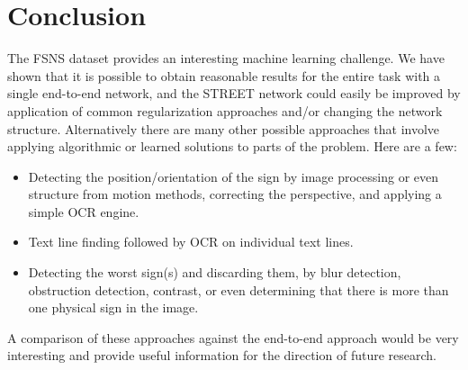 \documentclass[runningheads]{llncs}
\begin{document}
\section{Conclusion}
The FSNS dataset provides an interesting machine learning challenge. We have shown that it is possible to
 obtain reasonable results for the entire task with a single end-to-end network, and the STREET network
 could easily be improved by application of common regularization approaches and/or changing the network
 structure. Alternatively there are many other possible approaches that involve applying algorithmic or
 learned solutions to parts of the problem. Here are a few:
\begin{itemize}
\setlength\itemsep{0.5em}
\item[\labelitemii] Detecting the position/orientation of the sign by image processing or even structure from motion methods, correcting the perspective, and applying a simple OCR engine.
\item[\labelitemii] Text line finding followed by OCR on individual text lines.
\item[\labelitemii] Detecting the worst sign(s) and discarding them, by blur detection, obstruction
 detection, contrast, or even determining that there is more than one physical sign in the image.
\end{itemize}
A comparison of these approaches against the end-to-end approach would be very interesting and provide useful information for the direction of future research.



\end{document}
